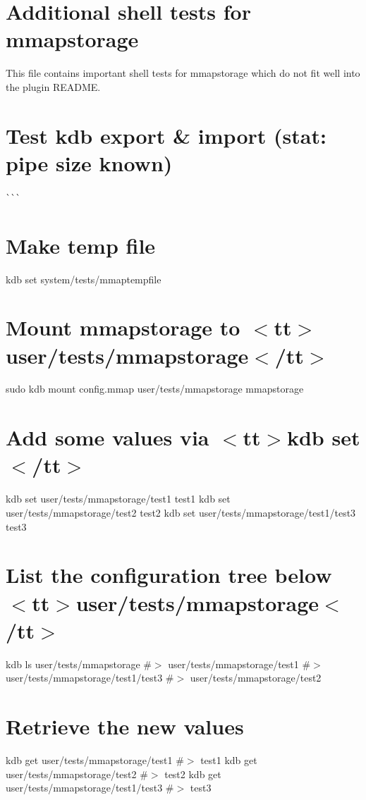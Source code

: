 \hypertarget{autotoc_md442_src_plugins_mmapstorage_shelltests_md}{}\section{Additional shell tests for mmapstorage}\label{autotoc_md442_src_plugins_mmapstorage_shelltests_md}
This file contains important shell tests for mmapstorage which do not fit well into the plugin R\+E\+A\+D\+ME.\hypertarget{autotoc_md442_autotoc_md443}{}\section{Test kdb export \& import (stat\+: pipe size known)}\label{autotoc_md442_autotoc_md443}
\`{}\`{}\`{} \hypertarget{autotoc_md442_autotoc_md444}{}\section{Make temp file}\label{autotoc_md442_autotoc_md444}
kdb set system/tests/mmaptempfile \hypertarget{autotoc_md442_autotoc_md445}{}\section{Mount mmapstorage to $<$tt$>$user/tests/mmapstorage$<$/tt$>$}\label{autotoc_md442_autotoc_md445}
sudo kdb mount config.\+mmap user/tests/mmapstorage mmapstorage\hypertarget{autotoc_md442_autotoc_md446}{}\section{Add some values via $<$tt$>$kdb set$<$/tt$>$}\label{autotoc_md442_autotoc_md446}
kdb set user/tests/mmapstorage/test1 test1 kdb set user/tests/mmapstorage/test2 test2 kdb set user/tests/mmapstorage/test1/test3 test3\hypertarget{autotoc_md442_autotoc_md447}{}\section{List the configuration tree below $<$tt$>$user/tests/mmapstorage$<$/tt$>$}\label{autotoc_md442_autotoc_md447}
kdb ls user/tests/mmapstorage \#$>$ user/tests/mmapstorage/test1 \#$>$ user/tests/mmapstorage/test1/test3 \#$>$ user/tests/mmapstorage/test2\hypertarget{autotoc_md442_autotoc_md448}{}\section{Retrieve the new values}\label{autotoc_md442_autotoc_md448}
kdb get user/tests/mmapstorage/test1 \#$>$ test1 kdb get user/tests/mmapstorage/test2 \#$>$ test2 kdb get user/tests/mmapstorage/test1/test3 \#$>$ test3

